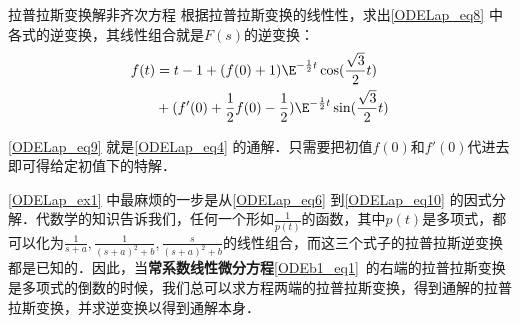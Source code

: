 \begin{example}{拉普拉斯变换解非齐次方程}
根据拉普拉斯变换的线性性，求出\autoref{ODELap_eq8} 中各式的逆变换，其线性组合就是$F(s)$的逆变换：
\begin{equation}\label{ODELap_eq9}
\begin{aligned}
f(t)&=t-1+(f(0)+1)\E^{-\frac{1}{2}t}\cos(\frac{\sqrt{3}}{2}t)\\&
+(f'(0)+\frac{1}{2}f(0)-\frac{1}{2})\E^{-\frac{1}{2}t}\sin(\frac{\sqrt{3}}{2}t)
\end{aligned}
\end{equation}

\autoref{ODELap_eq9} 就是\autoref{ODELap_eq4} 的通解．只需要把初值$f(0)$和$f'(0)$代进去即可得给定初值下的特解．




\end{example}

\autoref{ODELap_ex1} 中最麻烦的一步是从\autoref{ODELap_eq6} 到\autoref{ODELap_eq10} 的因式分解．代数学的知识告诉我们，任何一个形如$\frac{1}{p(t)}$的函数，其中$p(t)$是多项式，都可以化为$\frac{1}{s+a}, \frac{1}{(s+a)^2+b}, \frac{s}{(s+a)^2+b}$的线性组合，而这三个式子的拉普拉斯逆变换都是已知的．因此，当\textbf{常系数线性微分方程}\autoref{ODEb1_eq1}~的右端的拉普拉斯变换是多项式的倒数的时候，我们总可以求方程两端的拉普拉斯变换，得到通解的拉普拉斯变换，并求逆变换以得到通解本身．















